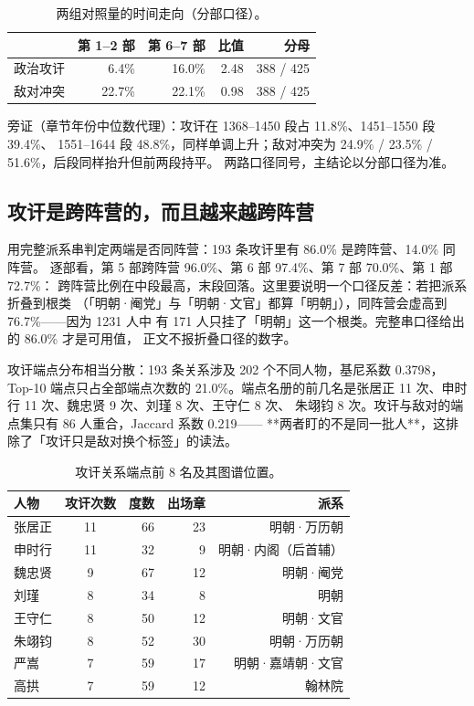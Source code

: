\begin{table}[!t]
\centering
\caption{两组对照量的时间走向（分部口径）。}
\label{trend}
\small
\begin{tabular}{lrrrr}
\toprule
 & 第 1--2 部 & 第 6--7 部 & 比值 & 分母 \\\midrule
政治攻讦 & 6.4\% & 16.0\% & 2.48 & 388 / 425 \\
敌对冲突 & 22.7\% & 22.1\% & 0.98 & 388 / 425 \\
\bottomrule
\end{tabular}
\end{table}

旁证（章节年份中位数代理）：攻讦在 1368--1450 段占 11.8\%、1451--1550 段 39.4\%、
1551--1644 段 48.8\%，同样单调上升；敌对冲突为 24.9\% / 23.5\% / 51.6\%，后段同样抬升但前两段持平。
两路口径同号，主结论以分部口径为准。

\subsection{攻讦是跨阵营的，而且越来越跨阵营}

用完整派系串判定两端是否同阵营：193 条攻讦里有 86.0\% 是跨阵营、14.0\% 同阵营。
逐部看，第 5 部跨阵营 96.0\%、第 6 部 97.4\%、第 7 部 70.0\%、第 1 部 72.7\%：
跨阵营比例在中段最高，末段回落。这里要说明一个口径反差：若把派系折叠到根类
（「明朝·阉党」与「明朝·文官」都算「明朝」），同阵营会虚高到 76.7\%——因为 1231 人中
有 171 人只挂了「明朝」这一个根类。完整串口径给出的 86.0\% 才是可用值，
正文不报折叠口径的数字。

攻讦端点分布相当分散：193 条关系涉及 202 个不同人物，基尼系数 0.3798，Top-10 端点只占全部端点次数的
21.0\%。端点名册的前几名是张居正 11 次、申时行 11 次、魏忠贤 9 次、刘瑾 8 次、王守仁 8 次、
朱翊钧 8 次。攻讦与敌对的端点集只有 86 人重合，Jaccard 系数 0.219——
**两者盯的不是同一批人**，这排除了「攻讦只是敌对换个标签」的读法。

\begin{table}[!t]
\centering
\caption{攻讦关系端点前 8 名及其图谱位置。}
\label{topend}
\small
\begin{tabular}{lcrrr}
\toprule
人物 & 攻讦次数 & 度数 & 出场章 & 派系 \\\midrule
张居正 & 11 & 66 & 23 & 明朝·万历朝 \\
申时行 & 11 & 32 & 9 & 明朝·内阁（后首辅）\\
魏忠贤 & 9 & 67 & 12 & 明朝·阉党 \\
刘瑾 & 8 & 34 & 8 & 明朝 \\
王守仁 & 8 & 50 & 12 & 明朝·文官 \\
朱翊钧 & 8 & 52 & 30 & 明朝·万历朝 \\
严嵩 & 7 & 59 & 17 & 明朝·嘉靖朝·文官 \\
高拱 & 7 & 59 & 12 & 翰林院 \\
\bottomrule
\end{tabular}
\end{table}

